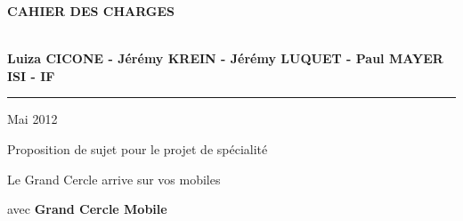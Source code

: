\documentclass[a4paper, 11px]{article}
\begin{document}
\begin{titlepage}
\begin{center}
\begin{center}
{\Huge \bf CAHIER DES CHARGES}


\end{center}


\vspace{1cm}

\begin{center}
$ $\\
\large{ \textbf{Luiza CICONE - Jérémy KREIN - Jérémy LUQUET - Paul MAYER}}\\
\large{ \textbf{ISI - IF}}
$ $\\
\end{center}
\rule{\linewidth}{.5pt}


\vfill


{\large Mai 2012}

\end{center}
\end{titlepage}

\tableofcontents

\newpage


%
\newenvironment{myenumerate}{%
  \edef\backupindent{\the\parindent}%
  \enumerate%
  \setlength{\parindent}{\backupindent}%
}{\endenumerate}

%

\renewcommand{\appendixtocname}{Annexes}

\begin{center}
 Proposition de sujet pour le projet de spécialité

 {\Large Le Grand Cercle arrive sur vos mobiles

 avec {\bf Grand Cercle Mobile}}
\end{center}
\vspace{1cm}
\end{document}
